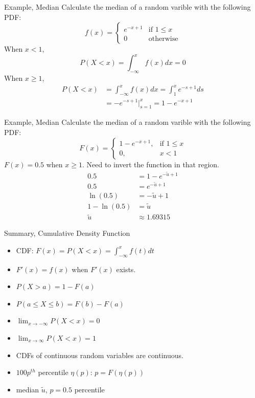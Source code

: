 \documentclass[handout]{beamer}
\begin{document}
\begin{frame}{Example, Median}
    Calculate the median of a random varible with the following PDF:
    $$f(x)=\begin{cases} e^{-x+1} & \text{if }1\leq x \\
            0        & \text{otherwise}\end{cases} $$
    \pause When $x<1$,
    \pause $$ P(X<x) = \int_{-\infty}^x f(x) dx = 0$$
    \pause When $x\geq 1$,
    \pause
    \begin{align*} P(X<x) & = \int_{-\infty}^x f(x) dx = \int_{1}^x e^{-s+1} ds \\
               & = -e^{-s+1}\bigg|_{s=1}^x = 1 - e^{-x+1}
    \end{align*}
\end{frame}
\begin{frame}{Example, Median}
    Calculate the median of a random varible with the following PDF:
    $$F(x)=\begin{cases} 1- e^{-x+1}, & \text{if }1\leq x \\
            0,           & x<1
        \end{cases}$$
    \pause $F(x) = 0.5$ when $x\geq 1$. Need to invert the function in that region.
    \pause
    \begin{align*}
        0.5            & = 1 - e^{-\tilde{u}+1} \\
        0.5            & = e^{-\tilde{u}+1}     \\
        \ln{(0.5)}     & = -\tilde{u}+1         \\
        1 - \ln{(0.5)} & = \tilde{u}            \\
        \tilde{u}      & \approx 1.69315
    \end{align*}
    \vfill
\end{frame}
\begin{frame}{Summary, Cumulative Density Function}
    \begin{itemize}
        \item CDF: $F(x) = P(X<x) = \int_{-\infty}^x f(t) dt$
        \item $F'(x) = f(x)$ when $F'(x)$ exists.
        \item $P(X>a)=1-F(a)$
        \item $P(a\leq X \leq b)=F(b)-F(a)$
        \item $\lim_{x\to -\infty}P(X<x) =0$
        \item $\lim_{x\to \infty}P(X<x) =1$
        \item CDFs of continuous random variables are continuous.
        \item $100p^{th}$ percentile $\eta(p)$: $p=F(\eta(p))$
        \item median $\tilde{u}$, $p=0.5$ percentile
    \end{itemize}
\end{frame}
\end{document}
